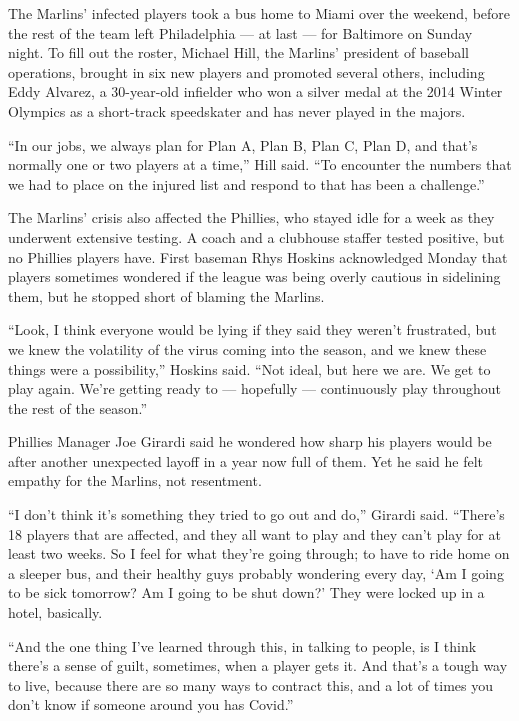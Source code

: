 The Marlins' infected players took a bus home to Miami over the weekend,
before the rest of the team left Philadelphia --- at last --- for
Baltimore on Sunday night. To fill out the roster, Michael Hill, the
Marlins' president of baseball operations, brought in six new players
and promoted several others, including Eddy Alvarez, a 30-year-old
infielder who won a silver medal at the 2014 Winter Olympics as a
short-track speedskater and has never played in the majors.

``In our jobs, we always plan for Plan A, Plan B, Plan C, Plan D, and
that's normally one or two players at a time,'' Hill said. ``To
encounter the numbers that we had to place on the injured list and
respond to that has been a challenge.''

The Marlins' crisis also affected the Phillies, who stayed idle for a
week as they underwent extensive testing. A coach and a clubhouse
staffer tested positive, but no Phillies players have. First baseman
Rhys Hoskins acknowledged Monday that players sometimes wondered if the
league was being overly cautious in sidelining them, but he stopped
short of blaming the Marlins.

``Look, I think everyone would be lying if they said they weren't
frustrated, but we knew the volatility of the virus coming into the
season, and we knew these things were a possibility,'' Hoskins said.
``Not ideal, but here we are. We get to play again. We're getting ready
to --- hopefully --- continuously play throughout the rest of the
season.''

Phillies Manager Joe Girardi said he wondered how sharp his players
would be after another unexpected layoff in a year now full of them. Yet
he said he felt empathy for the Marlins, not resentment.

``I don't think it's something they tried to go out and do,'' Girardi
said. ``There's 18 players that are affected, and they all want to play
and they can't play for at least two weeks. So I feel for what they're
going through; to have to ride home on a sleeper bus, and their healthy
guys probably wondering every day, `Am I going to be sick tomorrow? Am I
going to be shut down?' They were locked up in a hotel, basically.

``And the one thing I've learned through this, in talking to people, is
I think there's a sense of guilt, sometimes, when a player gets it. And
that's a tough way to live, because there are so many ways to contract
this, and a lot of times you don't know if someone around you has
Covid.''

